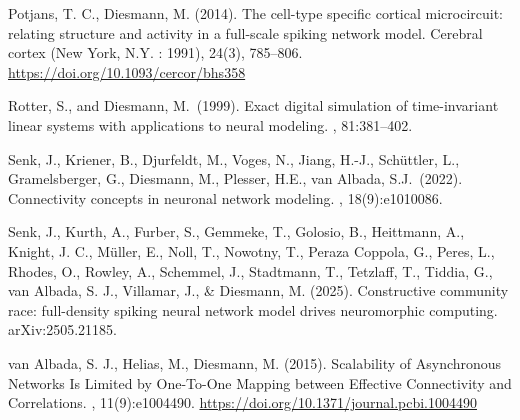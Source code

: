 \documentclass[10pt,a4paper,twoside,american]{article}
\theoremstyle{definitionstyle}
\begin{document}
\clearpage
\begin{thebibliography}{}

  Potjans, T. C., Diesmann, M. (2014).
  \newblock The cell-type specific cortical microcircuit: relating structure and activity in a full-scale spiking network model. 
  \newblock Cerebral cortex (New York, N.Y. : 1991), 24(3), 785–806.
  \newblock \url{https://doi.org/10.1093/cercor/bhs358}

  Rotter, S., and Diesmann, M.~(1999).
  \newblock Exact digital simulation of time-invariant linear systems with applications to neural modeling.
  , 81:381--402.

  Senk, J., Kriener, B., Djurfeldt, M., Voges, N., Jiang, H.-J., Sch\"uttler, L., Gramelsberger, G., Diesmann, M., Plesser, H.E., van Albada, S.J.~(2022).
  \newblock Connectivity concepts in neuronal network modeling.
  , 18(9):e1010086.

  Senk, J., Kurth, A., Furber, S., Gemmeke, T., Golosio, B., Heittmann, A., Knight, J. C., M\"uller, E., Noll, T., Nowotny, T., Peraza Coppola, G., Peres, L., Rhodes, O., Rowley, A., Schemmel, J., Stadtmann, T., Tetzlaff, T., Tiddia, G., van Albada, S. J., Villamar, J., \& Diesmann, M. (2025). 
  \newblock Constructive community race: full-density spiking neural network model drives neuromorphic computing.
  \newblock arXiv:2505.21185.

van Albada, S. J., Helias, M., Diesmann, M. (2015).
\newblock Scalability of Asynchronous Networks Is Limited by One-To-One Mapping between Effective Connectivity and Correlations.
, 11(9):e1004490.
\newblock \url{https://doi.org/10.1371/journal.pcbi.1004490}

\end{thebibliography}
\end{document}
